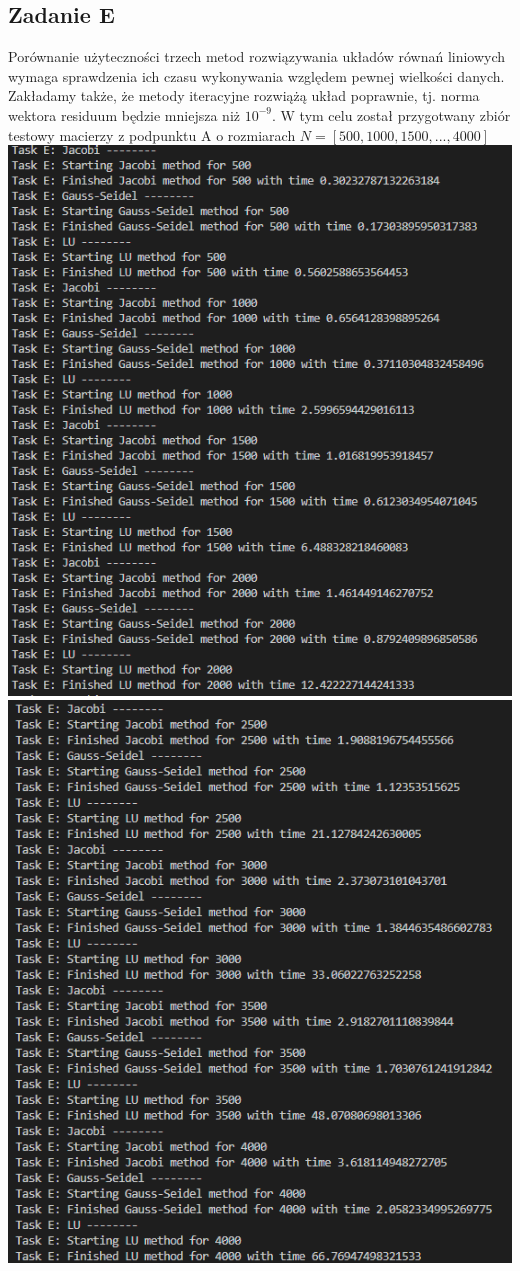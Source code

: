 \documentclass[12pt]{article}
\begin{document}
\subsection{Zadanie E}
Porównanie użyteczności trzech metod rozwiązywania układów równań liniowych wymaga sprawdzenia ich czasu wykonywania względem pewnej wielkości
danych. Zakładamy także, że metody iteracyjne rozwiążą układ poprawnie, tj. norma wektora residuum będzie mniejsza niż $10^{-9}$.
W tym celu został przygotwany zbiór testowy macierzy z podpunktu A o rozmiarach $N = [500, 1000, 1500, ... , 4000]$\\
\includegraphics{zadanieE_1}
\includegraphics{zadanieE_2}
\end{document}
